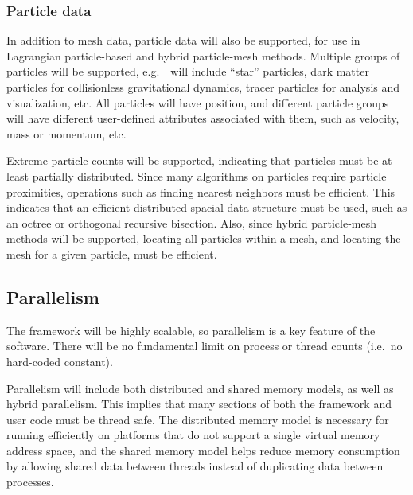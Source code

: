 \documentclass[10pt,twocolumn]{article}
\begin{document}
\subsubsection{Particle data} \label{sss:require-particles}

In addition to mesh data, particle data will also be supported, for
use in Lagrangian particle-based and hybrid particle-mesh methods.
Multiple groups of particles will be supported, e.g.~\enzoii\ will
include ``star'' particles, dark matter particles for collisionless
gravitational dynamics, tracer particles for analysis and
visualization, etc.  All particles will have position, and different particle
groups will have different user-defined attributes associated with them, such
as velocity, mass or momentum, etc.

Extreme particle counts will be supported, indicating that particles
must be at least partially distributed.  Since many algorithms on
particles require particle proximities, operations such as finding
nearest neighbors must be efficient.  This indicates that an efficient
distributed spacial data structure must be used, such as an octree or
orthogonal recursive bisection.  Also, since hybrid particle-mesh
methods will be supported, locating all particles within a mesh, and
locating the mesh for a given particle, must be efficient.


\subsection{Parallelism} \label{ss:require-parallel}

The framework will be highly scalable, so parallelism is a key
feature of the software.  There will be no fundamental limit on
process or thread counts (i.e.~no hard-coded  constant).

Parallelism will include both distributed and shared memory models, as
well as hybrid parallelism.  This implies that many sections of both
the framework and user code must be thread safe.  The distributed
memory model is necessary for running efficiently on platforms that do
not support a single virtual memory address space, and the shared
memory model helps reduce memory consumption by allowing shared data
between threads instead of duplicating data between processes.
\end{document}
